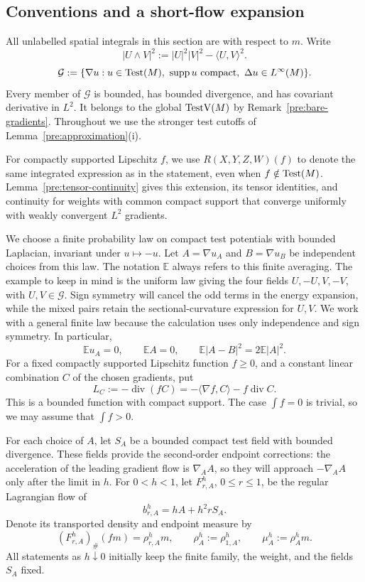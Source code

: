 \subsection{Conventions and a short-flow expansion}

All unlabelled spatial integrals in this section are with respect to
\(m\). Write
\[
 |U\wedge V|^2:=|U|^2|V|^2-\langle U,V\rangle^2.
\]
\[
 \mathcal G:=\{\nabla u:
 u\in\operatorname{Test}(M),\ \operatorname{supp}u\text{ compact},\
 \Delta u\in L^\infty(M)\}.
\]
Every member of \(\mathcal G\) is bounded, has bounded divergence,
and has covariant derivative in \(L^2\). It belongs to the global
\(\operatorname{TestV}(M)\) by Remark~\ref{pre:bare-gradients}. Throughout we use
the stronger test cutoffs of Lemma~\ref{pre:approximation}\textup{(i)}.

For compactly supported Lipschitz \(f\), we use
\(R(X,Y,Z,W)(f)\) to denote the same integrated expression
as in the statement, even when \(f\notin\operatorname{Test}(M)\).
Lemma~\ref{pre:tensor-continuity} gives this extension, its tensor
identities, and continuity for weights with common compact support
that converge uniformly with weakly convergent \(L^2\) gradients.

We choose a finite probability law on compact test potentials with
bounded Laplacian, invariant under \(u\mapsto-u\). Let \(A=\nabla u_A\)
and \(B=\nabla u_B\) be independent choices from this law. The notation
\(\mathbb E\) always refers to this finite averaging. The example to
keep in mind is the uniform law giving the four fields
\(U,-U,V,-V\), with \(U,V\in\mathcal G\). Sign symmetry will cancel
the odd terms in the energy expansion, while the mixed pairs retain
the sectional-curvature expression for \(U,V\). We work with a
general finite law because the calculation uses only independence
and sign symmetry. In particular,
\begin{equation}
\label{fwd:centering}
 \mathbb E u_A=0,\qquad \mathbb E A=0,\qquad
 \mathbb E|A-B|^2=2\mathbb E|A|^2.
\end{equation}
For a fixed compactly supported Lipschitz function \(f\geq0\), and a
constant linear combination \(C\) of the chosen gradients, put
\[
 L_C:=-\operatorname{div}(fC)
      =-\langle\nabla f,C\rangle-f\operatorname{div}C.
\]
This is a bounded function with compact support. The case
\(\int f=0\) is trivial, so we may assume that \(\int f>0\).

For each choice of \(A\), let \(S_A\) be a bounded compact test field
with bounded divergence. These fields provide the second-order
endpoint corrections: the acceleration of the leading gradient flow
is \(\nabla_AA\), so they will approach \(-\nabla_AA\) only
after the limit in \(h\). For \(0<h<1\), let \(F^h_{r,A}\),
\(0\leq r\leq1\), be the regular Lagrangian flow of
\begin{equation}
\label{fwd:prescribed-velocity}
 b^h_{r,A}=hA+h^2rS_A.
\end{equation}
Denote its transported density and endpoint measure by
\[
 (F^h_{r,A})_\#(fm)=\rho^h_{r,A}m,
 \qquad \rho^h_A:=\rho^h_{1,A},\qquad \mu^h_A:=\rho^h_A m.
\]
All statements as \(h\downarrow0\) initially keep the finite family,
the weight, and the fields \(S_A\) fixed.


